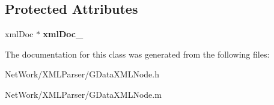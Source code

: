 \subsection*{Protected Attributes}
\begin{DoxyCompactItemize}
\item 
\hypertarget{interface_g_data_x_m_l_document_a8ad6e8cee0d74d2b3b28c83099e14e48}{xml\+Doc $\ast$ {\bfseries xml\+Doc\+\_\+}}\label{interface_g_data_x_m_l_document_a8ad6e8cee0d74d2b3b28c83099e14e48}

\end{DoxyCompactItemize}


The documentation for this class was generated from the following files\+:\begin{DoxyCompactItemize}
\item 
Net\+Work/\+X\+M\+L\+Parser/G\+Data\+X\+M\+L\+Node.\+h\item 
Net\+Work/\+X\+M\+L\+Parser/G\+Data\+X\+M\+L\+Node.\+m\end{DoxyCompactItemize}
